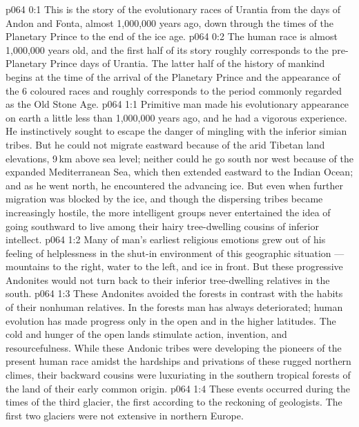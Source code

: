 \author{Life Carrier}
\vs p064 0:1 This is the story of the evolutionary races of Urantia from the days of Andon and Fonta, almost 1,000,000 years ago, down through the times of the Planetary Prince to the end of the ice age.
\vs p064 0:2 The human race is almost 1,000,000 years old, and the first half of its story roughly corresponds to the pre\hyp{}Planetary Prince days of Urantia. The latter half of the history of mankind begins at the time of the arrival of the Planetary Prince and the appearance of the 6 coloured races and roughly corresponds to the period commonly regarded as the Old Stone Age.
\vs p064 1:1 Primitive man made his evolutionary appearance on earth a little less than 1,000,000 years ago, and he had a vigorous experience. He instinctively sought to escape the danger of mingling with the inferior simian tribes. But he could not migrate eastward because of the arid Tibetan land elevations, 9\,km above sea level; neither could he go south nor west because of the expanded Mediterranean Sea, which then extended eastward to the Indian Ocean; and as he went north, he encountered the advancing ice. But even when further migration was blocked by the ice, and though the dispersing tribes became increasingly hostile, the more intelligent groups never entertained the idea of going southward to live among their hairy tree\hyp{}dwelling cousins of inferior intellect.
\vs p064 1:2 Many of man’s earliest religious emotions grew out of his feeling of helplessness in the shut\hyp{}in environment of this geographic situation --- mountains to the right, water to the left, and ice in front. But these progressive Andonites would not turn back to their inferior tree\hyp{}dwelling relatives in the south.
\vs p064 1:3 These Andonites avoided the forests in contrast with the habits of their nonhuman relatives. In the forests man has always deteriorated; human evolution has made progress only in the open and in the higher latitudes. The cold and hunger of the open lands stimulate action, invention, and resourcefulness. While these Andonic tribes were developing the pioneers of the present human race amidst the hardships and privations of these rugged northern climes, their backward cousins were luxuriating in the southern tropical forests of the land of their early common origin.
\vs p064 1:4 \pc These events occurred during the times of the third glacier, the first according to the reckoning of geologists. The first two glaciers were not extensive in northern Europe.
